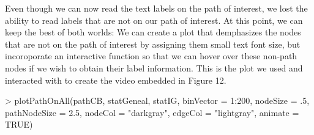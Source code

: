 \documentclass{article}
\begin{document}
Even though we can now read the text labels on the path of interest, we lost the ability to read labels that are not on our path of interest. At this point, we can keep the best of both worlds: We can create a plot that demphasizes the nodes that are not on the path of interest by assigning them small text font size, but incoroporate an interactive function so that we can hover over these non-path nodes if we wish to obtain their label information. This is the plot we used and interacted with to create the video embedded in Figure 12.

\begin{Schunk}
\begin{Sinput}
> plotPathOnAll(pathCB, statGeneal, statIG, binVector = 1:200, nodeSize = .5, pathNodeSize = 2.5, nodeCol = "darkgray", edgeCol = "lightgray", animate = TRUE)
\end{Sinput}
\end{Schunk}
\end{document}
